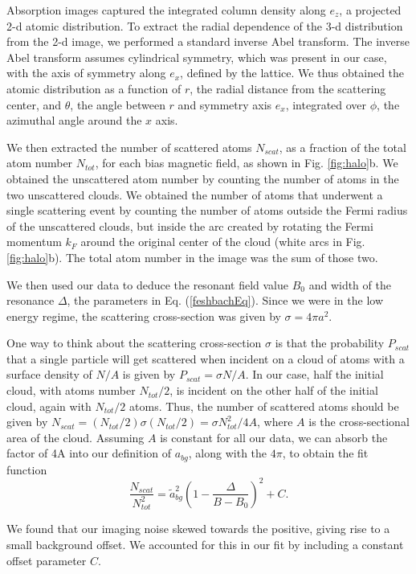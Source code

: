 \documentclass[12pt]{iopart}
\begin{document}
\par Absorption images captured the integrated column density along $e_z$, a projected 2-d atomic distribution. To extract the radial dependence of the 3-d distribution from the 2-d image, we performed a standard inverse Abel transform. The inverse Abel transform assumes cylindrical symmetry, which was present in our case, with the axis of symmetry along $e_x$, defined by the lattice. We thus obtained the atomic distribution as a function of $r$, the radial distance from the scattering center, and $\theta$, the angle between $r$ and symmetry axis $e_x$, integrated over $\phi$, the azimuthal angle around the $x$ axis. 
\par We then extracted the number of scattered atoms $N_{scat}$, as a fraction of the total atom number $N_{tot}$, for each bias magnetic field, as shown in Fig. \ref{fig:halo}b. We obtained the unscattered atom number by counting the number of atoms in the two unscattered clouds. We obtained the number of atoms that underwent a single scattering event by counting the number of atoms outside the Fermi radius of the unscattered clouds, but inside the arc created by rotating the Fermi momentum $k_F$ around the original center of the cloud (white arcs in Fig. \ref{fig:halo}b). The total atom number in the image was the sum of those two.
\par We then used our data to deduce the resonant field value $B_0$ and width of the resonance  $\Delta$, the parameters in Eq. (\ref{feshbachEq}).  Since we were in the low energy regime, the scattering cross-section was given by $\sigma=4\pi a^2$. 
\par One way to think about the scattering cross-section $\sigma$ is that the probability $P_{scat}$ that a single particle will get scattered when incident on a cloud of atoms with a surface density of $N/A$ is given by $P_{scat}=\sigma N/A$. In our case, half the initial cloud, with atoms number $N_{tot}/2$, is incident on the other half of the initial cloud, again with $N_{tot}/2$ atoms. Thus, the number of scattered atoms should be given by $N_{scat}= (N_{tot}/2) \sigma  (N_{tot}/2)=\sigma N_{tot}^2/4A$, where $A$ is the cross-sectional area of the cloud. Assuming $A$ is constant for all our data, we can absorb the factor of 4A into our definition of $a_{bg}$, along with the $4\pi$, to obtain the fit function
\begin{equation}
\frac{N_{scat}}{N_{tot}^2}=\tilde{a}_{bg}^2\left(1-\frac{\Delta}{B-B_0}\right)^2 + C.
\label{eq:fit}
\end{equation}
\par We found that our imaging noise skewed towards the positive, giving rise to a small background offset. We accounted for this in our fit by including a constant offset parameter $C$. 
\end{document}
